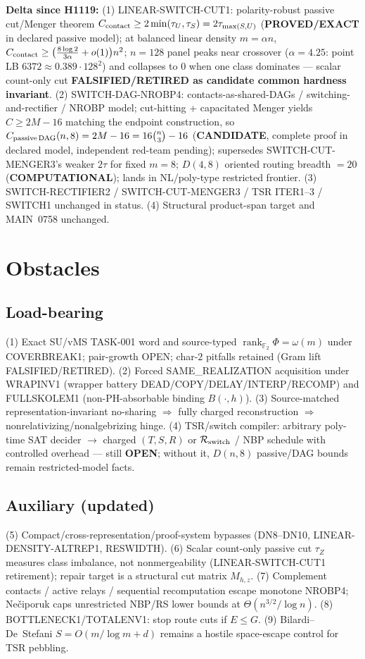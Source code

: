 \documentclass[11pt]{article}
\begin{document}
\textbf{Delta since H1119:}
(1) LINEAR-SWITCH-CUT1: polarity-robust passive cut/Menger theorem
$C_{\rm contact}\ge 2\min(\tau_U,\tau_S)=2\tau_{\max(S,U)}$
(\textbf{PROVED/EXACT} in declared passive model); at balanced linear density
$m=\alpha n$,
$C_{\rm contact}\ge\bigl(\tfrac{8\log 2}{3\alpha}+o(1)\bigr)n^2$;
$n=128$ panel peaks near crossover ($\alpha=4.25$: point LB $6372\approx0.389\cdot 128^2$)
and collapses to $0$ when one class dominates --- scalar count-only cut
\textbf{FALSIFIED/RETIRED as candidate common hardness invariant}.
(2) SWITCH-DAG-NROBP4: contacts-as-shared-DAGs / switching-and-rectifier / NROBP model;
cut-hitting + capacitated Menger yields $C\ge 2M-16$ matching the endpoint construction,
so
$C_{\rm passive\,DAG}(n,8)=2M-16=16\binom n3-16$
(\textbf{CANDIDATE}, complete proof in declared model, independent red-team pending);
supersedes SWITCH-CUT-MENGER3's weaker $2\tau$ for fixed $m=8$;
$D(4,8)$ oriented routing breadth $=20$ (\textbf{COMPUTATIONAL});
lands in NL/poly-type restricted frontier.
(3) SWITCH-RECTIFIER2 / SWITCH-CUT-MENGER3 / TSR ITER1--3 / SWITCH1 unchanged in status.
(4) Structural product-span target and MAIN~0758 unchanged.

\section*{Obstacles}
\subsection*{Load-bearing}
(1) Exact SU/vMS TASK-001 word and source-typed
$\operatorname{rank}_{\mathbb F_2}\Phi=\omega(m)$ under COVERBREAK1; pair-growth OPEN;
char-$2$ pitfalls retained (Gram lift FALSIFIED/RETIRED).
(2) Forced SAME\_REALIZATION acquisition under WRAPINV1 (wrapper battery DEAD/COPY/DELAY/INTERP/RECOMP)
and FULLSKOLEM1 (non-PH-absorbable binding $B(\cdot,h)$).
(3) Source-matched representation-invariant no-sharing $\Rightarrow$ fully charged reconstruction
$\Rightarrow$ nonrelativizing/nonalgebrizing hinge.
(4) TSR/switch compiler: arbitrary poly-time SAT decider $\to$ charged $(T,S,R)$ or
$\mathcal R_{\rm switch}$ / NBP schedule with controlled overhead --- still \textbf{OPEN};
without it, $D(n,8)$ passive/DAG bounds remain restricted-model facts.

\subsection*{Auxiliary (updated)}
(5) Compact/cross-representation/proof-system bypasses (DN8--DN10, LINEAR-DENSITY-ALTREP1, RESWIDTH).
(6) Scalar count-only passive cut $\tau_Z$ measures class imbalance, not nonmergeability
(LINEAR-SWITCH-CUT1 retirement); repair target is a structural cut matrix $M_{h,z}$.
(7) Complement contacts / active relays / sequential recomputation escape monotone NROBP4;
Ne\v{c}iporuk caps unrestricted NBP/RS lower bounds at $\Theta(n^{3/2}/\log n)$.
(8) BOTTLENECK1/TOTALENV1: stop route cuts if $E\le G$.
(9) Bilardi--De~Stefani $S=O(m/\log m+d)$ remains a hostile space-escape control for TSR pebbling.
\end{document}
